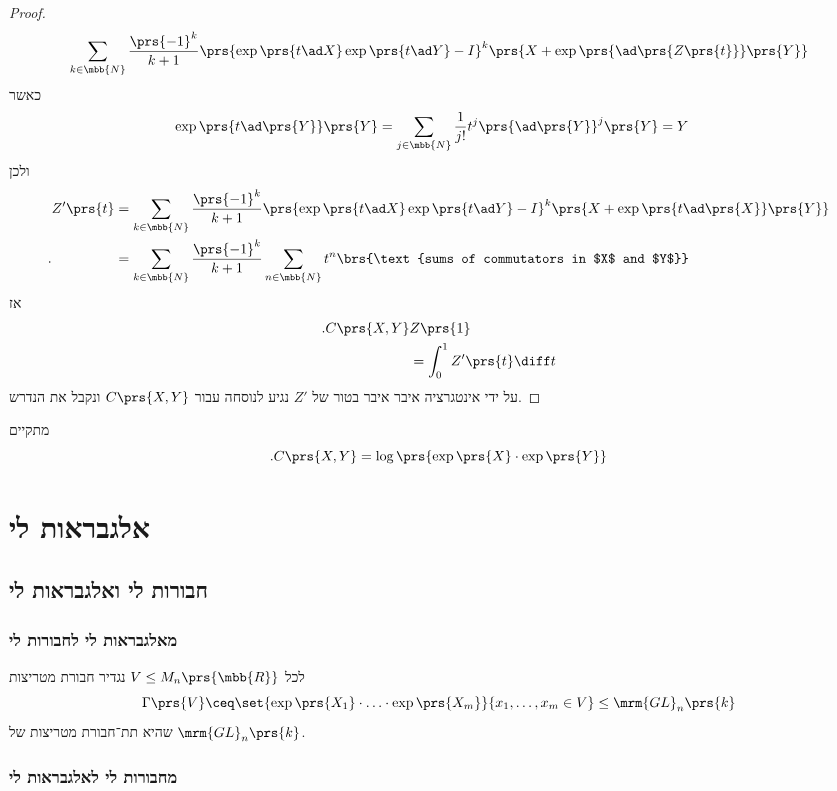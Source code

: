 \documentclass[10pt, twoside]{book}
\begin{document}
\begin{proof}
\begin{align*}
\sum_{k \in \mbb{N}} \frac{\prs{-1}^k}{k+1} \prs{\exp\prs{t \ad X} \exp\prs{t \ad Y} - I}^k \prs{X + \exp\prs{\ad \prs{Z\prs{t}}} \prs{Y}}
\end{align*}
כאשר
\begin{align*}
\exp\prs{t \ad \prs{Y}} \prs{Y} &= \sum_{j \in \mbb{N}} \frac{1}{j!} t^j \prs{\ad \prs{Y}}^j \prs{Y} = Y
\end{align*}
ולכן
\begin{align*}
Z'\prs{t} &= \sum_{k \in \mbb{N}} \frac{\prs{-1}^k}{k+1} \prs{\exp\prs{t \ad X} \exp\prs{t \ad Y} - I}^k \prs{X + \exp\prs{t \ad\prs{X}} \prs{Y}}
\\\text{.} \hphantom{Z'\prs{t}} &=
\sum_{k \in \mbb{N}} \frac{\prs{-1}^k}{k+1} \sum_{n \in \mbb{N}} t^n \brs{\text{sums of commutators in $X$ and $Y$}}
\end{align*}
אז
\begin{align*}
\text{.} C\prs{X,Y} & Z\prs{1}
\\&=
\int_0^1 Z'\prs{t} \diff t
\end{align*}
על ידי אינטגרציה איבר איבר בטור של
$Z'$
נגיע לנוסחה עבור
$C\prs{X,Y}$
ונקבל את הנדרש.
\end{proof}

\begin{remark}
מתקיים
\[\text{.} C\prs{X,Y} = \log\prs{\exp\prs{X} \cdot \exp\prs{Y}}\]
\end{remark}

\chapter{אלגבראות לי}

\section{חבורות לי ואלגבראות לי}

\subsection{מאלגבראות לי לחבורות לי}

לכל
$V \leq M_n\prs{\mbb{R}}$
נגדיר חבורת מטריצות
\[\Gamma\prs{V} \ceq \set{\exp\prs{X_1} \cdot \ldots \cdot \exp\prs{X_m}}{x_1, \ldots, x_m \in V} \leq \mrm{GL}_n\prs{k}\]
שהיא תת־חבורת מטריצות של
$\mrm{GL}_n\prs{k}$.

\subsection{מחבורות לי לאלגבראות לי}
\end{document}
